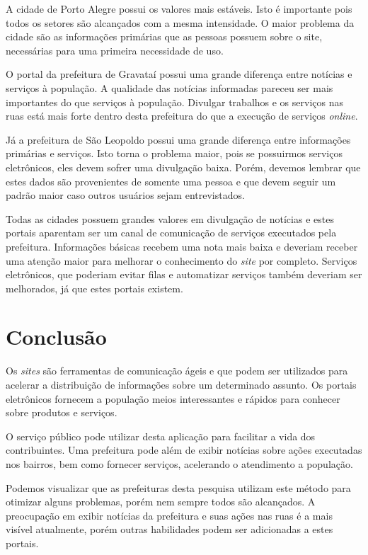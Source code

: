 \documentclass{article}
\begin{document}
A cidade de Porto Alegre possui os valores mais estáveis. Isto é importante pois
todos os setores são alcançados com a mesma intensidade. O maior problema da
cidade são as informações primárias que as pessoas possuem sobre o site,
necessárias para uma primeira necessidade de uso.

O portal da prefeitura de Gravataí possui uma grande diferença entre notícias e
serviços à população. A qualidade das notícias informadas pareceu ser mais
importantes do que serviços à população. Divulgar trabalhos e os serviços nas
ruas está mais forte dentro desta prefeitura do que a execução de serviços
\textit{online}.

Já a prefeitura de São Leopoldo possui uma grande diferença entre informações
primárias e serviços. Isto torna o problema maior, pois se possuirmos serviços
eletrônicos, eles devem sofrer uma divulgação baixa. Porém, devemos lembrar que
estes dados são provenientes de somente uma pessoa e que devem seguir um padrão
maior caso outros usuários sejam entrevistados.

Todas as cidades possuem grandes valores em divulgação de notícias e estes
portais aparentam ser um canal de comunicação de serviços executados pela
prefeitura. Informações básicas recebem uma nota mais baixa e deveriam receber
uma atenção maior para melhorar o conhecimento do \textit{site} por completo.
Serviços eletrônicos, que poderiam evitar filas e automatizar serviços também
deveriam ser melhorados, já que estes portais existem.

\section{Conclusão}

Os \textit{sites} são ferramentas de comunicação ágeis e que podem ser
utilizados para acelerar a distribuição de informações sobre um determinado
assunto. Os portais eletrônicos fornecem a população meios interessantes e
rápidos para conhecer sobre produtos e serviços.

O serviço público pode utilizar desta aplicação para facilitar a vida dos
contribuintes. Uma prefeitura pode além de exibir notícias sobre ações
executadas nos bairros, bem como fornecer serviços, acelerando o atendimento a
população.

Podemos visualizar que as prefeituras desta pesquisa utilizam este método para
otimizar alguns problemas, porém nem sempre todos são alcançados. A preocupação
em exibir notícias da prefeitura e suas ações nas ruas é a mais visível
atualmente, porém outras habilidades podem ser adicionadas a estes portais.
\end{document}
